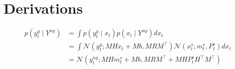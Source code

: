 \documentclass{article}
\newcommand{\norm}[3]{\mathcal{N}\left(#1; #2, #3\right)} %
\let\Oldsection\section
\renewcommand{\section}{\FloatBarrier\Oldsection}
\begin{document}
\section{Derivations}

\setcounter{equation}{0} 

\begin{equation}\label{eq:deriv_predictions}
\begin{split}
    p(y_t^g \mid Y^{ng}) &= \int p(y^g_t \mid x_t) p(x_t \mid Y^{ng}) dx_t\\
    & = \int \norm{y_t^g}{MHx_t + Mb}{MRM^\top} \norm{x^s_t}{m^s_t}{P^s_t} dx_t\\
    & = \norm{y^{ng}_t}{MHm^s_t + Mb}{MRM^\top + MHP^s_tH^\top M^\top}
\end{split}
\end{equation}
\end{document}
